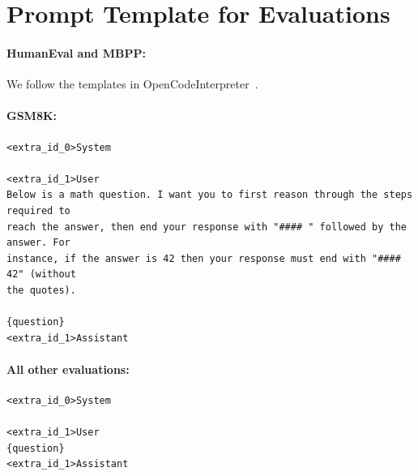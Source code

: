 \documentclass[11pt]{article}
\begin{document}
\section{Prompt Template for Evaluations}
\label{sec:sup-prompt-template-for-eval}
\paragraph{HumanEval and MBPP:} We follow the templates in OpenCodeInterpreter~\citep{zheng2024opencodeinterpreter}.
 
\paragraph{GSM8K:}
\begin{verbatim}
<extra_id_0>System

<extra_id_1>User
Below is a math question. I want you to first reason through the steps required to
reach the answer, then end your response with "#### " followed by the answer. For 
instance, if the answer is 42 then your response must end with "#### 42" (without
the quotes).

{question}
<extra_id_1>Assistant

\end{verbatim}
\paragraph{All other evaluations:}
\begin{verbatim}
<extra_id_0>System

<extra_id_1>User
{question}
<extra_id_1>Assistant

\end{verbatim}
\end{document}
